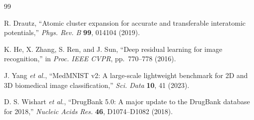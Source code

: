 \documentclass[article]{amsart}
\theoremstyle{definition}
\begin{document}
\begin{thebibliography}{99}

R. Drautz, ``Atomic cluster expansion for accurate and transferable interatomic potentials,'' \emph{Phys. Rev. B} \textbf{99}, 014104 (2019).

K. He, X. Zhang, S. Ren, and J. Sun, ``Deep residual learning for image recognition,'' in \emph{Proc. IEEE CVPR}, pp.~770--778 (2016).

J. Yang \emph{et al.}, ``MedMNIST v2: A large-scale lightweight benchmark for 2D and 3D biomedical image classification,'' \emph{Sci. Data} \textbf{10}, 41 (2023).

D. S. Wishart \emph{et al.}, ``DrugBank 5.0: A major update to the DrugBank database for 2018,'' \emph{Nucleic Acids Res.} \textbf{46}, D1074--D1082 (2018).

\end{thebibliography}
\end{document}
